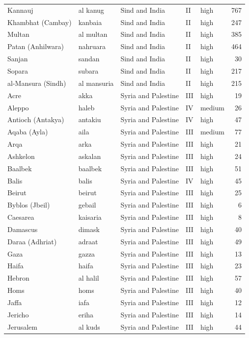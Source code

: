 \documentclass[11pt,a4paper]{article}
\begin{document}
{\begin{longtable}{p{4.6cm}p{3.0cm}p{3.6cm}llr}
Kannauj & al kanug & Sind and India & II & high & 767\\
Khambhat (Cambay) & kanbaia & Sind and India & II & high & 247\\
Multan & al multan & Sind and India & II & high & 385\\
Patan (Anhilwara) & nahruara & Sind and India & II & high & 464\\
Sanjan & sandan & Sind and India & II & high & 30\\
Sopara & subara & Sind and India & II & high & 217\\
al-Mansura (Sindh) & al mansuria & Sind and India & II & high & 215\\
Acre & akka & Syria and Palestine & III & high & 19\\
Aleppo & haleb & Syria and Palestine & IV & medium & 26\\
Antioch (Antakya) & antakiu & Syria and Palestine & IV & high & 47\\
Aqaba (Ayla) & aila & Syria and Palestine & III & medium & 77\\
Arqa & arka & Syria and Palestine & III & high & 21\\
Ashkelon & askalan & Syria and Palestine & III & high & 24\\
Baalbek & baalbek & Syria and Palestine & III & high & 51\\
Balis & balis & Syria and Palestine & IV & high & 45\\
Beirut & beirut & Syria and Palestine & III & high & 25\\
Byblos (Jbeil) & gebail & Syria and Palestine & III & high & 6\\
Caesarea & kaisaria & Syria and Palestine & III & high & 8\\
Damascus & dimask & Syria and Palestine & III & high & 40\\
Daraa (Adhriat) & adraat & Syria and Palestine & III & high & 49\\
Gaza & gazza & Syria and Palestine & III & high & 13\\
Haifa & haifa & Syria and Palestine & III & high & 23\\
Hebron & al halil & Syria and Palestine & III & high & 57\\
Homs & homs & Syria and Palestine & III & high & 40\\
Jaffa & iafa & Syria and Palestine & III & high & 12\\
Jericho & eriha & Syria and Palestine & III & high & 14\\
Jerusalem & al kuds & Syria and Palestine & III & high & 44\\

\end{longtable}}
\end{document}
